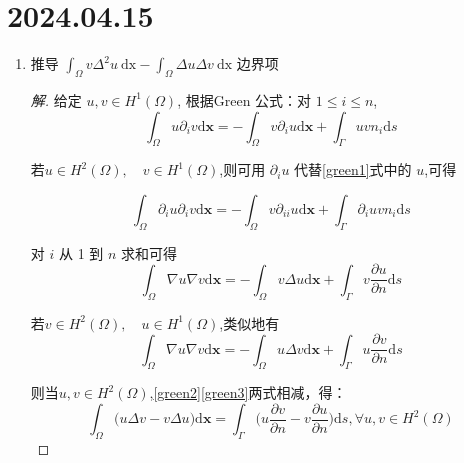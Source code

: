\documentclass[12pt,a4paper]{article}
\begin{document}
	
	\noindent
	
	\section*{2024.04.15}	
	
	
	\begin{enumerate}
		\item 推导		
		$
		\displaystyle \int_\Omega v\Delta^2u\mathrm{~dx}-\displaystyle \int_\Omega\Delta u\Delta v\mathrm{~dx}
		$
		边界项
		
		\begin{proof}[解]\let\qed\relax
			给定 $u,v\in H^1(\Omega)$, 根据Green 公式：对 $1\leqslant i\leqslant n$,
			\begin{equation}
				\int_{\Omega}u\partial_{i}v\mathrm{d}\boldsymbol{x}=-\int_{\Omega}v\partial_{i}u\mathrm{d}\boldsymbol{x}+\int_{\Gamma}uvn_{i}\mathrm{d}s\label{green1}
			\end{equation}
			
			若$u\in H^2(\Omega),\quad v\in H^1(\Omega)$,则可用 $\partial_{i}u$ 代替\eqref{green1}式中的 $u$,可得
			
			$$
			\int_{\Omega}\partial_{i}u\partial_{i}v\mathrm{d}\boldsymbol{x}=-\int_{\Omega}v\partial_{ii}u\mathrm{d}\boldsymbol{x}+\int_{\Gamma}\partial_{i}uvn_{i}\mathrm{d}s
			$$
			
			对 $i$ 从 1 到 $n$ 求和可得
			\begin{equation}
				\int_{\Omega}\nabla u\nabla v\mathrm{d}\boldsymbol{x}=-\int_{\Omega}v\Delta u\mathrm{d}\boldsymbol{x}+\int_{\Gamma}v\frac{\partial u}{\partial n}\mathrm{d}s\label{green2}
			\end{equation}
			
			若$v\in H^2(\Omega),\quad u\in H^1(\Omega)$,类似地有
			\begin{equation}
				\int_{\Omega}\nabla u\nabla v\mathrm{d}\boldsymbol{x}=-\int_{\Omega}u\Delta v\mathrm{d}\boldsymbol{x}+\int_{\Gamma}u\frac{\partial v}{\partial n}\mathrm{d}s\label{green3}
			\end{equation}
			
			则当$u, v\in H^2(\Omega)$,\eqref{green2}\eqref{green3}两式相减，得：
			\begin{equation}
				\int_{\Omega}\big(u\Delta v-v\Delta u\big)\mathrm{d}\boldsymbol{x}=\int_{\Gamma}\big(u\frac{\partial v}{\partial n}-v\frac{\partial u}{\partial n}\big)\mathrm{d}s,\forall u,v\in H^{2}(\Omega)\label{green4}
			\end{equation}
			

\end{proof}
\end{enumerate}
\end{document}
